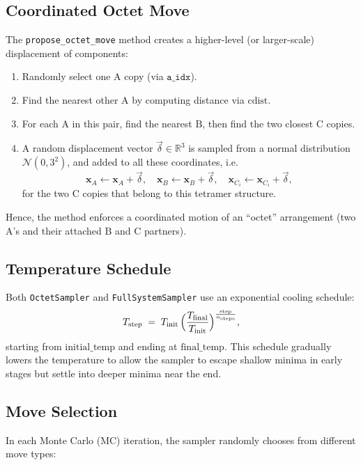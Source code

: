 \documentclass[12pt]{article}
\begin{document}
\subsection{Coordinated Octet Move}
The \texttt{propose\_octet\_move} method creates a higher-level (or larger-scale) displacement of components:
\begin{enumerate}
    \item Randomly select one \(\mathrm{A}\) copy (via \(\texttt{a\_idx}\)).
    \item Find the nearest other \(\mathrm{A}\) by computing distance via \(\mathrm{cdist}\).
    \item For each \( \mathrm{A} \) in this pair, find the nearest \(\mathrm{B}\), then find the two closest \(\mathrm{C}\) copies.
    \item A random displacement vector \(\vec{\delta} \in \mathbb{R}^3\) is sampled from a normal distribution \(\mathcal{N}(0,3^2)\), and added to all these coordinates, i.e.\ 
    \[
        \mathbf{x}_{A} \leftarrow \mathbf{x}_{A} + \vec{\delta},\quad
        \mathbf{x}_{B} \leftarrow \mathbf{x}_{B} + \vec{\delta},\quad
        \mathbf{x}_{C_i} \leftarrow \mathbf{x}_{C_i} + \vec{\delta}, 
    \]
    for the two \(\mathrm{C}\) copies that belong to this tetramer structure. 
\end{enumerate}
Hence, the method enforces a coordinated motion of an ``octet'' arrangement (two \(\mathrm{A}\)'s and their attached \(\mathrm{B}\) and \(\mathrm{C}\) partners).

\subsection{Temperature Schedule}
Both \texttt{OctetSampler} and \texttt{FullSystemSampler} use an exponential cooling schedule:
\[
    T_{\mathrm{step}} \;=\; T_{\mathrm{init}} \,\Bigl(
        \frac{T_{\mathrm{final}}}{T_{\mathrm{init}}}
    \Bigr)^{\frac{\mathrm{step}}{n_{\mathrm{steps}}}},
\]
starting from \(\mathrm{initial\_temp}\) and ending at \(\mathrm{final\_temp}\). This schedule gradually lowers the temperature to allow the sampler to escape shallow minima in early stages but settle into deeper minima near the end.

\subsection{Move Selection}
In each Monte Carlo (MC) iteration, the sampler randomly chooses from different move types:
\end{document}
